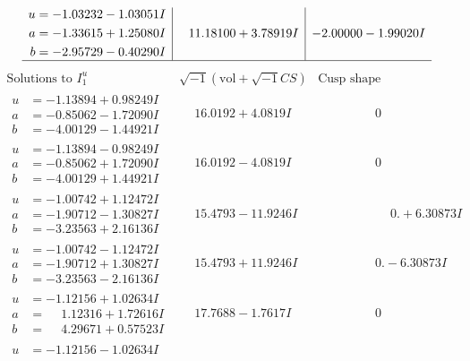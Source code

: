 \documentclass[1p]{elsarticle_modified}
\theoremstyle{definition}
\newcommand{\I}{\sqrt{-1}}
\begin{document}
$$\begin{array}{c|c|c}
\begin{aligned}
u &= -1.03232 - 1.03051 I \\
a &= -1.33615 + 1.25080 I \\
b &= -2.95729 - 0.40290 I\end{aligned}
 & \phantom{-}11.18100 + 3.78919 I & -2.00000 - 1.99020 I\\
 \hline 
 \end{array}$$\newpage$$\begin{array}{c|c|c}  
\text{Solutions to }I^u_{1}& \I (\text{vol} + \sqrt{-1}CS) & \text{Cusp shape}\\
 \hline 
\begin{aligned}
u &= -1.13894 + 0.98249 I \\
a &= -0.85062 - 1.72090 I \\
b &= -4.00129 - 1.44921 I\end{aligned}
 & \phantom{-}16.0192 + 4.0819 I & \phantom{-0.000000 } 0 \\ \hline\begin{aligned}
u &= -1.13894 - 0.98249 I \\
a &= -0.85062 + 1.72090 I \\
b &= -4.00129 + 1.44921 I\end{aligned}
 & \phantom{-}16.0192 - 4.0819 I & \phantom{-0.000000 } 0 \\ \hline\begin{aligned}
u &= -1.00742 + 1.12472 I \\
a &= -1.90712 - 1.30827 I \\
b &= -3.23563 + 2.16136 I\end{aligned}
 & \phantom{-}15.4793 - 11.9246 I & \phantom{-0.000000 -}0. + 6.30873 I \\ \hline\begin{aligned}
u &= -1.00742 - 1.12472 I \\
a &= -1.90712 + 1.30827 I \\
b &= -3.23563 - 2.16136 I\end{aligned}
 & \phantom{-}15.4793 + 11.9246 I & \phantom{-0.000000 } 0. - 6.30873 I \\ \hline\begin{aligned}
u &= -1.12156 + 1.02634 I \\
a &= \phantom{-}1.12316 + 1.72616 I \\
b &= \phantom{-}4.29671 + 0.57523 I\end{aligned}
 & \phantom{-}17.7688 - 1.7617 I & \phantom{-0.000000 } 0 \\ \hline\begin{aligned}
u &= -1.12156 - 1.02634 I \\

\end{aligned}
\end{array}$$
\end{document}
